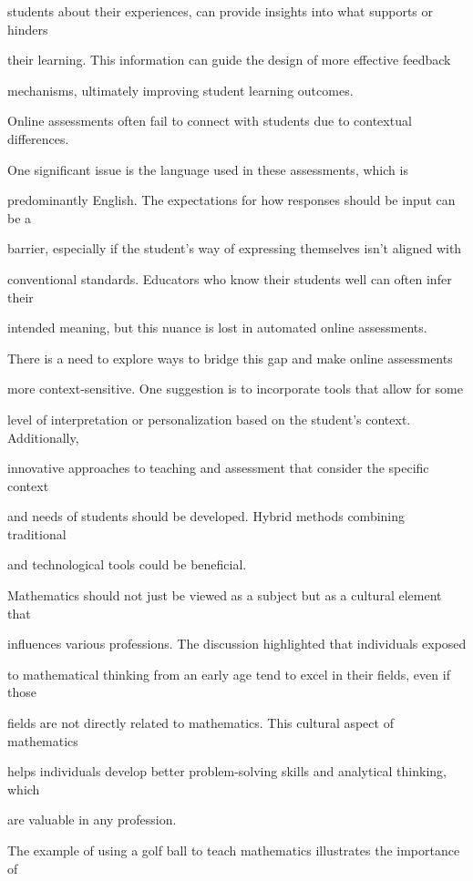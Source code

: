 \documentclass[11pt]{article}
\begin{document}
students about their experiences, can provide insights into what supports or hinders

their learning. This information can guide the design of more effective feedback

mechanisms, ultimately improving student learning outcomes.

Online assessments often fail to connect with students due to contextual differences.

One significant issue is the language used in these assessments, which is

predominantly English. The expectations for how responses should be input can be a

barrier, especially if the student's way of expressing themselves isn't aligned with

conventional standards. Educators who know their students well can often infer their

intended meaning, but this nuance is lost in automated online assessments.

There is a need to explore ways to bridge this gap and make online assessments

more context-sensitive. One suggestion is to incorporate tools that allow for some

level of interpretation or personalization based on the student's context. Additionally,

innovative approaches to teaching and assessment that consider the specific context

and needs of students should be developed. Hybrid methods combining traditional

and technological tools could be beneficial.

Mathematics should not just be viewed as a subject but as a cultural element that

influences various professions. The discussion highlighted that individuals exposed

to mathematical thinking from an early age tend to excel in their fields, even if those

fields are not directly related to mathematics. This cultural aspect of mathematics

helps individuals develop better problem-solving skills and analytical thinking, which

are valuable in any profession.

The example of using a golf ball to teach mathematics illustrates the importance of
\end{document}
